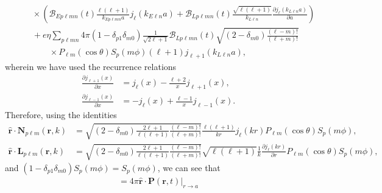 \documentclass{article}
\begin{document}
\begin{equation}
\begin{split}
&\qquad\times\left(\mathcal{B}_{Ep\ell mn}(t)\frac{\ell(\ell + 1)}{k_{Ep\ell mn}a}j_\ell(k_{E\ell n}a) + \mathcal{B}_{Lp\ell mn}(t)\frac{\sqrt{\ell(\ell + 1)}}{k_{L\ell n}}\frac{\partial j_{\ell}(k_{L\ell n}a)}{\partial a}\right)\\
&\qquad + e\eta\sum_{p\ell mn}4\pi(1 - \delta_{p1}\delta_{m0})\frac{1}{\sqrt{2\ell + 1}}\mathcal{B}_{Lp\ell mn}(t)\sqrt{(2 - \delta_{m0})\frac{(\ell - m)!}{(\ell + m)!}}\\
&\qquad\qquad\times P_{\ell m}(\cos\theta)S_p(m\phi)(\ell + 1)j_{\ell + 1}(k_{L\ell n}a),
\end{split}
\end{equation}
wherein we have used the recurrence relations
\begin{equation}
\begin{split}
\frac{\partial j_{\ell + 1}(x)}{\partial x} &= j_\ell(x) - \frac{\ell + 2}{x}j_{\ell + 1}(x),\\
\frac{\partial j_{\ell - 1}(x)}{\partial x} &= -j_\ell(x) + \frac{\ell - 1}{x}j_{\ell - 1}(x).
\end{split}
\end{equation}
Therefore, using the identities
\begin{equation}
\begin{split}
\hat{\mathbf{r}}\cdot\mathbf{N}_{p\ell m}(\mathbf{r},k) &= \sqrt{(2 - \delta_{m0})\frac{2\ell + 1}{\ell(\ell + 1)}\frac{(\ell - m)!}{(\ell + m)!}}\frac{\ell(\ell + 1)}{kr}j_{\ell}(kr)P_{\ell m}(\cos\theta)S_p(m\phi),\\
\hat{\mathbf{r}}\cdot\mathbf{L}_{p\ell m}(\mathbf{r},k) &= \sqrt{(2 - \delta_{m0})\frac{2\ell + 1}{\ell(\ell + 1)}\frac{(\ell - m)!}{(\ell + m)!}}\sqrt{\ell(\ell + 1)}\frac{1}{k}\frac{\partial j_{\ell}(kr)}{\partial r}P_{\ell m}(\cos\theta)S_p(m\phi),
\end{split}
\end{equation}
and $(1 - \delta_{p1}\delta_{m0})S_p(m\phi) = S_p(m\phi)$, we can see that
\begin{equation}
\begin{split}
= 4\pi\hat{\mathbf{r}}\cdot\left.\mathbf{P}(\mathbf{r},t)\right|_{r\to a}\\
\end{split}
\end{equation}
\end{document}
